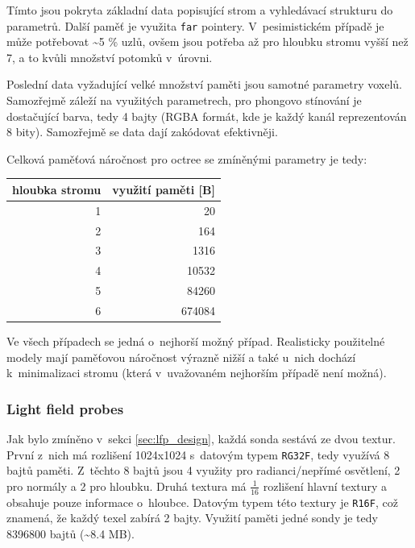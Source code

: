 Tímto jsou pokryta základní data popisující strom a vyhledávací strukturu do parametrů. Další paměť je využita \texttt{far} pointery. V~pesimistickém případě je může potřebovat \textasciitilde5 \% uzlů, ovšem jsou potřeba až pro hloubku stromu vyšší než 7, a to kvůli množství potomků v~úrovni.

Poslední data vyžadující velké množství paměti jsou samotné parametry voxelů. Samozřejmě záleží na využitých parametrech, pro phongovo stínování je dostačující barva, tedy 4 bajty (RGBA formát, kde je každý kanál reprezentován 8 bity). Samozřejmě se data dají zakódovat efektivněji.

Celková paměťová náročnost pro octree se zmíněnými parametry je tedy:

\begin{table}[H]
	\centering
	\begin{tabular}{|r|r|}
		\hline
		\multicolumn{1}{|c|}{hloubka stromu} & \multicolumn{1}{c|}{využití paměti {[}B{]}} \\ \hline
		1                                    & 20                                          \\ \hline
		2                                    & 164                                         \\ \hline
		3                                    & 1316                                        \\ \hline
		4                                    & 10532                                       \\ \hline
		5                                    & 84260                                       \\ \hline
		6                                    & 674084                                      \\ \hline
	\end{tabular}
	\captionsetup{justification=centering}
\end{table}

Ve všech případech se jedná o~nejhorší možný případ. Realisticky použitelné modely mají paměťovou náročnost výrazně nižší a také u~nich dochází k~minimalizaci stromu (která v~uvažovaném nejhorším případě není možná).


\subsubsection{Light field probes}
Jak bylo zmíněno v~sekci \ref{sec:lfp_design}, každá sonda sestává ze dvou textur. První z~nich má rozlišení 1024x1024 s~datovým typem \texttt{RG32F}, tedy využívá 8 bajtů paměti. Z~těchto 8 bajtů jsou 4 využity pro radianci/nepřímé osvětlení, 2 pro normály a 2 pro hloubku. Druhá textura má $\frac{1}{16}$ rozlišení hlavní textury a obsahuje pouze informace o~hloubce. Datovým typem této textury je \texttt{R16F}, což znamená, že každý texel zabírá 2 bajty. Využití paměti jedné sondy je tedy 8396800 bajtů (\textasciitilde{}8.4 MB).

